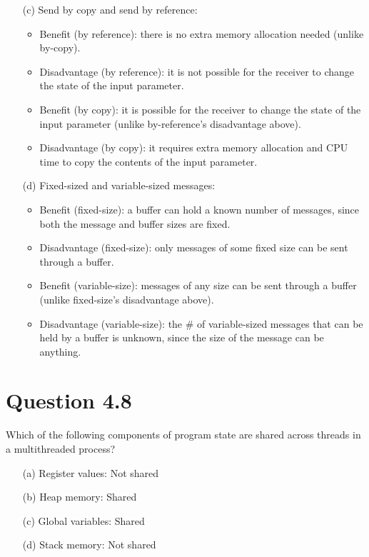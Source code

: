 \documentclass[12pt]{article}
\begin{document}
{\begin{enumerate}
\item[(c)]Send by copy and send by reference: {\color{black}
\begin{itemize}
\item Benefit (by reference): there is no extra memory allocation needed (unlike by-copy).
\item Disadvantage (by reference): it is not possible for the receiver to change the state of the input parameter.
\item Benefit (by copy): it is possible for the receiver to change the state of the input parameter (unlike by-reference's disadvantage above).
\item Disadvantage (by copy): it requires extra memory allocation and CPU time to copy the contents of the input parameter.
\end{itemize}
}

\item[(d)]Fixed-sized and variable-sized messages: {\color{black}
\begin{itemize}
\item Benefit (fixed-size): a buffer can hold a known number of messages, since both the message and buffer sizes are fixed.
\item Disadvantage (fixed-size): only messages of some fixed size can be sent through a buffer.
\item Benefit (variable-size): messages of any size can be sent through a buffer (unlike fixed-size's disadvantage above).
\item Disadvantage (variable-size): the \# of variable-sized messages that can be held by a buffer is unknown, since the size of the message can be anything.
\end{itemize}
}


\end{enumerate}
}

\section*{Question 4.8} {\color{blue}Which of the following components of program state are shared across threads in a multithreaded process?
\begin{enumerate}
\item[(a)]Register values: {\color{black}Not shared}
\item[(b)]Heap memory: {\color{black}Shared}
\item[(c)]Global variables: {\color{black}Shared}
\item[(d)]Stack memory: {\color{black}Not shared}
\end{enumerate}
}
\end{document}
